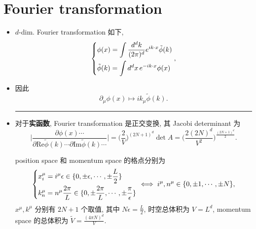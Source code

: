 \section{Fourier transformation}
\begin{itemize}
	\item $d$-dim. Fourier transformation 如下,
	\begin{equation} \label{Dirac delta function & Fourier transformation.2.1}
		\begin{dcases}
			\phi(x) = \int \frac{d^d k}{(2 \pi)^d} e^{i k \cdot x} \tilde{\phi}(k) \\
			\tilde{\phi}(k) = \int d^d x \, e^{- i k \cdot x} \phi(x)
		\end{dcases},
	\end{equation}
	
	\item 因此
	\begin{equation}
		\partial_\mu \phi(x) \mapsto i k_\mu \tilde{\phi}(k).
	\end{equation}
	
	\noindent\rule[0.5ex]{\linewidth}{0.5pt} %
	
	\item 对于\textbf{实函数}, Fourier transformation 是正交变换, 其 Jacobi determinant 为
	\begin{equation} \label{Dirac delta function & Fourier transformation.2.3}
		\Big| \frac{\partial \phi(x) \cdots}{\partial \mathrm{Re} \tilde{\phi}(k) \cdots \partial \mathrm{Im} \tilde{\phi}(k) \cdots} \Big| = \Big( \frac{2}{V} \Big)^{(2 N + 1)^d} \det A = \Big( \frac{2 (2 N)^d}{V^2} \Big)^{\frac{(2 N + 1)^d}{2}}.
	\end{equation}
	
	\begin{tcolorbox}[title=proof:]
		position space 和 momentum space 的格点分别为
		\begin{equation}
			\begin{dcases}
				x_i^\mu = i^\mu \epsilon \in \{0, \pm \epsilon, \cdots, \pm \frac{L}{2}\} \\
				k_n^\mu = n^\mu \frac{2 \pi}{L} \in \{0, \pm \frac{2 \pi}{L}, \cdots, \pm \frac{\pi}{\epsilon}\}
			\end{dcases} \iff i^\mu, n^\mu \in \{0, \pm 1, \cdots, \pm N\},
		\end{equation}
		$x^\mu, k^\mu$ 分别有 $2 N + 1$ 个取值, 其中 $N \epsilon = \frac{L}{2}$, 时空总体积为 $V = L^d$, momentum space 的总体积为 $\tilde{V} = \frac{(4 \pi N)^d}{V}$.
		

\end{tcolorbox}
\end{itemize}
